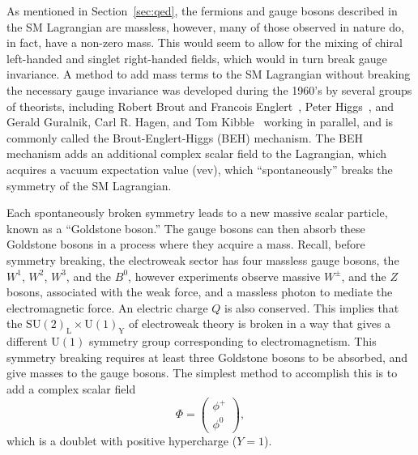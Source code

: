 As mentioned in Section~\ref{sec:qed}, the fermions and gauge bosons described
in the SM Lagrangian are massless, however, many of those observed in nature
do, in fact, have a non-zero mass.
This would seem to allow for the mixing of chiral left-handed and singlet
right-handed fields, which would in turn break gauge invariance.
A method to add mass terms to the SM Lagrangian without breaking the necessary
gauge invariance was developed during the 1960's by several groups of theorists,
including Robert Brout and Francois Englert~\cite{PhysRevLett.13.321},
Peter Higgs~\cite{Higgs1964132,PhysRevLett.13.508},
and Gerald Guralnik, Carl R. Hagen, and Tom Kibble~\cite{PhysRevLett.13.585}
working in parallel, and is commonly called the Brout-Englert-Higgs (BEH)
mechanism.
The BEH mechanism adds an additional complex scalar field to the Lagrangian,
which acquires a vacuum expectation value (vev), which ``spontaneously''
breaks the symmetry of the SM Lagrangian.

Each spontaneously broken symmetry leads to a new massive scalar particle,
known as a ``Goldstone boson.''
The gauge bosons can then absorb these Goldstone bosons in a process where they
acquire a mass.
Recall, before symmetry breaking, the electroweak sector has four massless
gauge bosons, the $W^1$, $W^2$,  $W^3$, and the $B^0$, however experiments
observe massive $W^{\pm}$, and the $Z$ bosons, associated with the weak force,
and a massless photon to mediate the electromagnetic force.
An electric charge $Q$ is also conserved.
This implies that the
$\mathrm{SU}(2)_\mathrm{L} \times \mathrm{U}(1)_\mathrm{Y}$ of electroweak
theory is broken in a way that gives a different $\mathrm{U}(1)$ symmetry group
corresponding to electromagnetism.
This symmetry breaking requires at least three Goldstone bosons to be absorbed,
and give masses to the gauge bosons.
The simplest method to accomplish this is to add a complex scalar field
\begin{equation}
  \Phi = \begin{pmatrix} \phi^+ \\ \phi^0 \end{pmatrix},
    \label{eqn:scalar_field}
\end{equation}
which is a doublet with positive hypercharge ($Y=1$).

